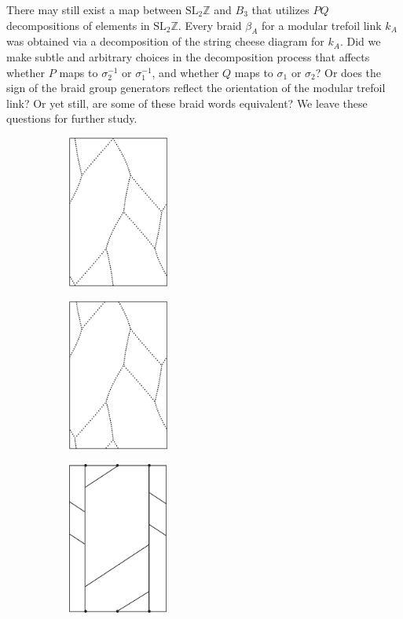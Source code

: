 \documentclass[12pt,twoside]{reedthesis}
\theoremstyle{definition}
\newcommand{\Z}{\mathbb{Z}}
\newcommand{\SLZ}{\mathrm{SL}_2{\Z}}
\begin{document}
There may still exist a map between $\SLZ$ and $B_3$ that utilizes $PQ$ decompositions of elements in $\SLZ$.
Every braid $\beta_A$ for a modular trefoil link $k_A$ was obtained via a decomposition of the string cheese diagram for $k_A$. 
Did we make subtle and arbitrary choices in the decomposition process that affects whether $P$ maps to $\sigma_2^{-1}$ or $\sigma_1^{-1}$, and whether $Q$ maps to $\sigma_1$ or $\sigma_2$?
Or does the sign of the braid group generators reflect the orientation of the modular trefoil link?
Or yet still, are some of these braid words equivalent? We leave these questions for further study.

\begin{figure}[p]
  \centering
  \begin{subfigure}[t]{0.24\linewidth}
    \centering
    \includegraphics[height=5cm]{figures/subset_loop_ppqq.pdf}
    \caption{}
  \end{subfigure}
  \hfill
  \begin{subfigure}[t]{0.24\linewidth}
    \centering
    \includegraphics[height=5cm]{figures/subset_loop_ppqq_shifted.pdf}
    \caption{}
  \end{subfigure}
  \hfill
  \begin{subfigure}[t]{0.24\linewidth}
    \centering
    \includegraphics[height=5cm]{figures/subset_loop_ppqq_normalized.pdf}

\end{subfigure}
\end{figure}
\end{document}
